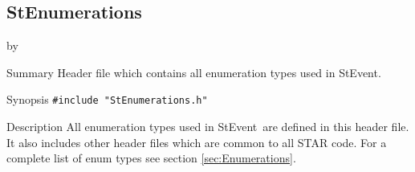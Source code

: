 \documentclass[twoside]{article}
\newcommand{\StEvent}{\textsf{StEvent}}
\newcommand{\entrylabel}[1]{\mbox{\textbf{{#1}}}\hfil}%
\newenvironment{entry}
{\begin{list}{}%
    {\renewcommand{\makelabel}{\entrylabel}%
     \setlength{\labelwidth}{90pt}%
     \setlength{\leftmargin}{\labelwidth}
     \advance\leftmargin by \labelsep%
      }%
    }%
  {\end{list}}
\newcommand{\Entrylabel}[1]%
{\raisebox{0pt}[1ex][0pt]{\makebox[\labelwidth][l]%
    {\parbox[t]{\labelwidth}{\hspace{0pt}\textbf{{#1}}}}}}
\newenvironment{Entry}%
{\renewcommand{\entrylabel}{\Entrylabel}\begin{entry}}%
  {\end{entry}}
\begin{document}
\subsection{StEnumerations}
\label{sec:StEnumerations}
\begin{Entry}
\item[Summary] Header file which contains all enumeration types used
    in \StEvent.
\item[Synopsis]
    \verb+#include "StEnumerations.h"+\\
\item[Description] All enumeration types used in \StEvent\ are defined
    in this header file. It also includes other header files which are
    common to all STAR code. For a complete list of enum types see
    section \ref{sec:Enumerations}.
\end{Entry}
\clearpage
\end{document}
